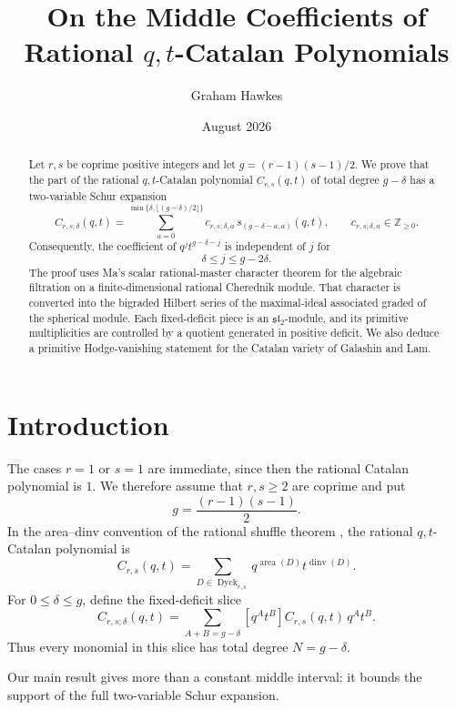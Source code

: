 \documentclass[11pt]{article}
\title{On the Middle Coefficients of Rational $q,t$-Catalan Polynomials}
\author{Graham Hawkes}
\date{August 2026}
\newcommand{\Z}{\mathbb{Z}}
\newcommand{\area}{\operatorname{area}}
\newcommand{\dinv}{\operatorname{dinv}}
\newcommand{\Dyck}{\operatorname{Dyck}}
\begin{document}
\maketitle

\begin{abstract}
Let $r,s$ be coprime positive integers and let
$g=(r-1)(s-1)/2$.  We prove that the part of the rational
$q,t$-Catalan polynomial $C_{r,s}(q,t)$ of total degree $g-\delta$
has a two-variable Schur expansion
\[
 C_{r,s;\delta}(q,t)
 =\sum_{a=0}^{\min\{\delta,\lfloor(g-\delta)/2\rfloor\}}
 c_{r,s;\delta,a}\,s_{(g-\delta-a,a)}(q,t),
 \qquad c_{r,s;\delta,a}\in\Z_{\geq 0}.
\]
Consequently, the coefficient of $q^jt^{g-\delta-j}$ is independent
of $j$ for
\[
 \delta\leq j\leq g-2\delta.
\]
The proof uses Ma's scalar rational-master character theorem for the
algebraic filtration on a finite-dimensional rational Cherednik
module.  That character is converted into the bigraded Hilbert series
of the maximal-ideal associated graded of the spherical module.  Each
fixed-deficit piece is an $\mathfrak{sl}_2$-module, and its primitive
multiplicities are controlled by a quotient generated in positive
deficit.  We also deduce a primitive Hodge-vanishing statement for the
Catalan variety of Galashin and Lam.
\end{abstract}

\section{Introduction}

The cases $r=1$ or $s=1$ are immediate, since then the rational
Catalan polynomial is $1$.  We therefore assume that $r,s\geq2$ are
coprime and put
\[
 g=\frac{(r-1)(s-1)}2.
\]
In the area--dinv convention of the rational shuffle theorem
\cite{Mellit}, the rational $q,t$-Catalan polynomial is
\begin{equation}\label{eq:Catalan-definition}
 C_{r,s}(q,t)
 =\sum_{D\in\Dyck_{r,s}}q^{\area(D)}t^{\dinv(D)}.
\end{equation}
For $0\leq\delta\leq g$, define the fixed-deficit slice
\begin{equation}\label{eq:deficit-slice}
 C_{r,s;\delta}(q,t)
 =\sum_{A+B=g-\delta}
 [q^At^B]C_{r,s}(q,t)\,q^At^B.
\end{equation}
Thus every monomial in this slice has total degree
$N=g-\delta$.

Our main result gives more than a constant middle interval: it bounds
the support of the full two-variable Schur expansion.
\end{document}
